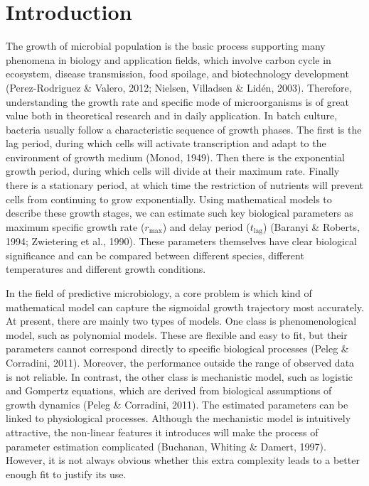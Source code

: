 \documentclass[11pt]{article}
\begin{document}
\section{Introduction}
The growth of microbial population is the basic process supporting many phenomena in biology and application fields, which involve carbon cycle in ecosystem, disease transmission, food spoilage, and biotechnology development (Perez-Rodriguez \& Valero, 2012; Nielsen, Villadsen \& Lidén, 2003). Therefore, understanding the growth rate and specific mode of microorganisms is of great value both in theoretical research and in daily application. In batch culture, bacteria usually follow a characteristic sequence of growth phases. The first is the lag period, during which cells will activate transcription and adapt to the environment of growth medium (Monod, 1949). Then there is the exponential growth period, during which cells will divide at their maximum rate. Finally there is a stationary period, at which time the restriction of nutrients will prevent cells from continuing to grow exponentially. Using mathematical models to describe these growth stages, we can estimate such key biological parameters as maximum specific growth rate (\(r_{\max}\)) and delay period (\(t_{\mathrm{lag}}\)) (Baranyi \& Roberts, 1994; Zwietering et al., 1990). These parameters themselves have clear biological significance and can be compared between different species, different temperatures and different growth conditions.

In the field of predictive microbiology, a core problem is which kind of mathematical model can capture the sigmoidal growth trajectory most accurately. At present, there are mainly two types of models. One class is phenomenological model, such as polynomial models. These are flexible and easy to fit, but their parameters cannot correspond directly to specific biological processes (Peleg \& Corradini, 2011). Moreover, the performance outside the range of observed data is not reliable. In contrast,  the other class is mechanistic model, such as logistic and Gompertz equations, which are derived from biological assumptions of growth dynamics (Peleg \& Corradini, 2011). The estimated parameters can be linked to physiological processes. Although the mechanistic model is intuitively attractive, the non-linear features it introduces will make the process of parameter estimation complicated (Buchanan, Whiting \& Damert, 1997). However, it is not always obvious whether this extra complexity leads to a better enough fit to justify its use.
\end{document}
